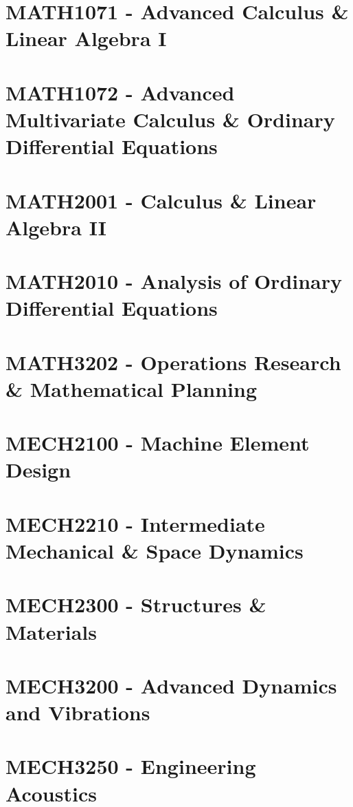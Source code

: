 \documentclass[a4paper,12pt]{report}
\begin{document}
\hypertarget{MATH1071}{\section{MATH1071 - Advanced Calculus \& Linear Algebra I}}

\hypertarget{MATH1072}{\section{MATH1072 - Advanced Multivariate Calculus \& Ordinary Differential Equations}}

\hypertarget{MATH2001}{\section{MATH2001 - Calculus \& Linear Algebra II}}

\hypertarget{MATH2010}{\section{MATH2010 - Analysis of Ordinary Differential Equations}}

\hypertarget{MATH3202}{\section{MATH3202 - Operations Research \& Mathematical Planning}}

\hypertarget{MECH2100}{\section{MECH2100 - Machine Element Design}}

\hypertarget{MECH2210}{\section{MECH2210 - Intermediate Mechanical \& Space Dynamics}}

\hypertarget{MECH2300}{\section{MECH2300 - Structures \& Materials}}

\hypertarget{MECH3200}{\section{MECH3200 - Advanced Dynamics and Vibrations}}

\hypertarget{MECH3250}{\section{MECH3250 - Engineering Acoustics}}
\end{document}
